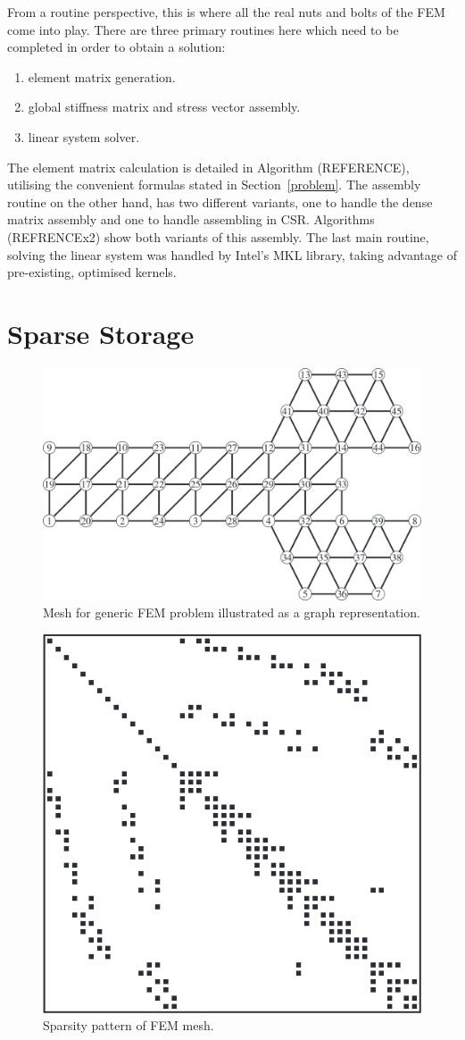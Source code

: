From a routine perspective, this is where all the real nuts and bolts of the FEM come into play.  There are three primary routines here which need to be completed in order to obtain a solution:
\begin{enumerate}
	\item element matrix generation.
	\item global stiffness matrix and stress vector assembly.
	\item linear system solver.
\end{enumerate}
The element matrix calculation is detailed in Algorithm (REFERENCE), utilising the convenient formulas stated in Section~\ref{problem}. The assembly routine on the other hand, has two different variants, one to handle the dense matrix assembly and one to handle assembling in CSR. Algorithms (REFRENCEx2) show both variants of this assembly. The last main routine, solving the linear system was handled by Intel's MKL library, taking advantage of pre-existing, optimised kernels.

\section{Sparse Storage}\label{sparse}

\begin{figure}
	\centering
	\includegraphics[width=0.7\linewidth]{Figures/mesh_graph}
	\caption{Mesh for generic FEM problem illustrated as a graph representation.}
	\label{fig:graph}
\end{figure}
\begin{figure}
	\centering
	\includegraphics[width=0.4\linewidth]{Figures/sparsity_pattern}
	\caption{Sparsity pattern of FEM mesh.}
	\label{fig:pattern}
\end{figure}

